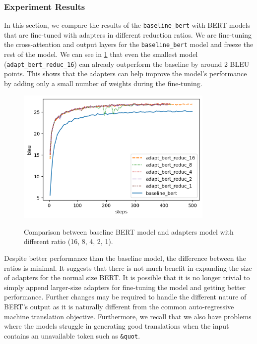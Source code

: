 \subsubsection{Experiment Results}
In this section, we compare the results of the \texttt{baseline\_bert} with BERT models that are fine-tuned with adapters in different reduction ratios. We are fine-tuning the cross-attention and output layers for the \texttt{baseline\_bert} model and freeze the rest of the model. We can see in \cref{img:adapt_bert_ratio} that even the smallest model (\texttt{adapt\_bert\_reduc\_16}) can already outperform the baseline by around 2 BLEU points. This shows that the adapters can help improve the model's performance by adding only a small number of weights during the fine-tuning.

\begin{figure}[]
    {\includegraphics[width=0.85\textwidth]{img/adapter_bert_baseline_adapters.png}}
    \centering
    \caption{Comparison between baseline BERT model and adapters model with different ratio (16, 8, 4, 2, 1).}
    \label{img:adapt_bert_ratio}
\end{figure}

Despite better performance than the baseline model, the difference between the ratios is minimal. It suggests that there is not much benefit in expanding the size of adapters for the normal size BERT. It is possible that it is no longer trivial to simply append larger-size adapters for fine-tuning the model and getting better performance. Further changes may be required to handle the different nature of BERT's output as it is naturally different from the common auto-regressive machine translation objective. Furthermore, we recall that we also have problems where the models struggle in generating good translations when the input contains an unavailable token such as \texttt{\&quot\;}.

